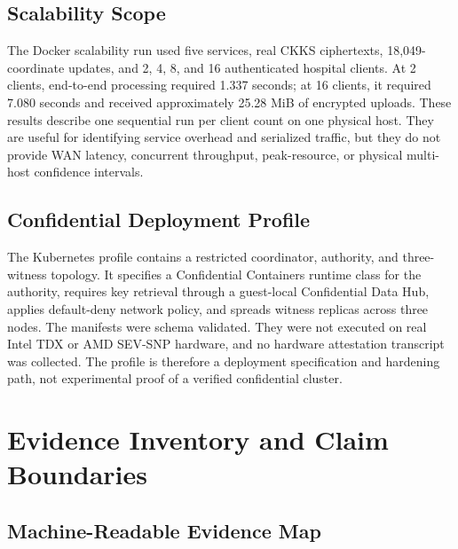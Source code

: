 \section{Scalability Scope}
\label{appsec:scalability-scope}

The Docker scalability run used five services, real CKKS ciphertexts, 18,049-coordinate updates, and 2, 4, 8, and 16 authenticated hospital clients. At 2 clients, end-to-end processing required 1.337 seconds; at 16 clients, it required 7.080 seconds and received approximately 25.28 MiB of encrypted uploads. These results describe one sequential run per client count on one physical host. They are useful for identifying service overhead and serialized traffic, but they do not provide WAN latency, concurrent throughput, peak-resource, or physical multi-host confidence intervals.

\section{Confidential Deployment Profile}
\label{appsec:confidential-profile}

The Kubernetes profile contains a restricted coordinator, authority, and three-witness topology. It specifies a Confidential Containers runtime class for the authority, requires key retrieval through a guest-local Confidential Data Hub, applies default-deny network policy, and spreads witness replicas across three nodes. The manifests were schema validated. They were not executed on real Intel TDX or AMD SEV-SNP hardware, and no hardware attestation transcript was collected. The profile is therefore a deployment specification and hardening path, not experimental proof of a verified confidential cluster.


\chapter{Evidence Inventory and Claim Boundaries}
\label{app:evidence-inventory}

\section{Machine-Readable Evidence Map}
\label{appsec:evidence-map}

